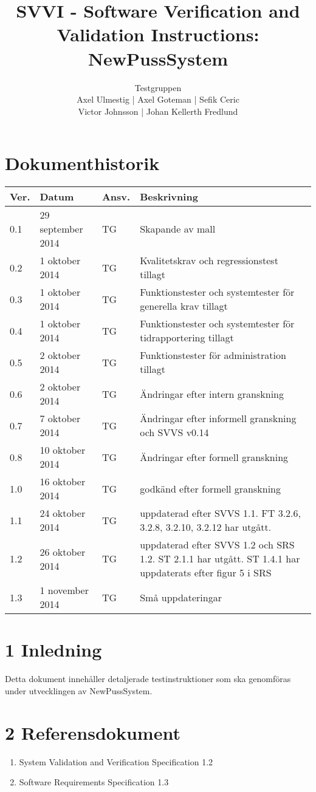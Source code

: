 \documentclass[a4paper]{article}
\title{SVVI - Software Verification and Validation Instructions: NewPussSystem}
\author{Testgruppen \\ Axel Ulmestig | Axel Goteman | Sefik Ceric \\ Victor Johnsson | Johan Kellerth Fredlund}
\date{}
\begin{document}
\maketitle
\thispagestyle{fancy}
\tableofcontents
\newpage

\section*{Dokumenthistorik}

\begin{tabular}{ l l l p{9cm} }
Ver. & Datum & Ansv. & Beskrivning \\\hline
0.1 & 29 september 2014 & TG & Skapande av mall \\
0.2 & 1 oktober 2014 & TG & Kvalitetskrav och regressionstest tillagt \\
0.3 & 1 oktober 2014 & TG & Funktionstester och systemtester för generella krav tillagt\\
0.4 & 1 oktober 2014 & TG & Funktionstester och systemtester för tidrapportering tillagt\\
0.5 & 2 oktober 2014 & TG & Funktionstester för administration tillagt\\
0.6 & 2 oktober 2014 & TG & Ändringar efter intern granskning\\
0.7 & 7 oktober 2014 & TG & Ändringar efter informell granskning och SVVS v0.14\\
0.8 & 10 oktober 2014 & TG & Ändringar efter formell granskning\\
1.0 & 16 oktober 2014 & TG & godkänd efter formell granskning\\
1.1 & 24 oktober 2014 & TG & uppdaterad efter SVVS 1.1. FT 3.2.6, 3.2.8, 3.2.10, 3.2.12 har utgått. \\
1.2 & 26 oktober 2014 & TG & uppdaterad efter SVVS 1.2 och SRS 1.2. ST 2.1.1 har utgått. ST 1.4.1 har uppdaterats efter figur 5 i SRS\\
1.3 & 1 november 2014 & TG & Små uppdateringar\\

\end{tabular}
\section{1 Inledning}       

Detta dokument innehåller detaljerade testinstruktioner som ska genomföras under utvecklingen av NewPussSystem.

\section{2 Referensdokument}
\begin{enumerate}
\item System Validation and Verification Specification 1.2
\item Software Requirements Specification 1.3
\end{enumerate}
\end{document}
